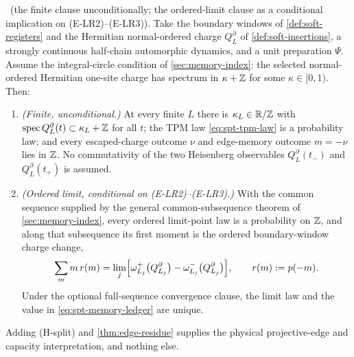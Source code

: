 \begin{theorem}\label{thm:spt-memory}
\statusProved\ (the finite clause unconditionally; the ordered-limit clause as
a conditional implication on (E-LR2)--(E-LR3)). Take the boundary windows of
\cref{def:soft-registers} and the Hermitian normal-ordered charge
$Q^{\partial}_L$ of \cref{def:soft-insertions}, a strongly continuous
half-chain automorphic dynamics, and a unit preparation $\Psi$. Assume the
integral-circle condition of \cref{sec:memory-index}: the selected
normal-ordered Hermitian one-site charge has spectrum in $\kappa+\mathbb{Z}$ for some
$\kappa\in[0,1)$. Then:
\begin{enumerate}
\item \emph{(Finite, unconditional.)} At every finite $L$ there is
  $\kappa_L\in\mathbb{R}/\mathbb{Z}$ with $\operatorname{spec} Q^{\partial}_L(t)\subset\kappa_L+\mathbb{Z}$ for all
  $t$; the TPM law \eqref{eq:spt-tpm-law} is a probability law; and every
  escaped-charge outcome $\nu$ and edge-memory outcome $m=-\nu$ lies in $\mathbb{Z}$.
  No commutativity of the two Heisenberg observables $Q^{\partial}_L(t_-)$ and
  $Q^{\partial}_L(t_+)$ is assumed.
\item \emph{(Ordered limit, conditional on (E-LR2)--(E-LR3).)} With the
  common sequence supplied by the general common-subsequence theorem of
  \cref{sec:memory-index}, every ordered limit-point law is a probability on
  $\mathbb{Z}$, and along that subsequence its first moment is the ordered
  boundary-window charge change,
  \begin{equation}
    \sum_m m\,r(m)
     =\lim_{j}\Bigl[\omega^{+}_{L_j}\bigl(Q^{\partial}_{L_j}\bigr)
                   -\omega^{-}_{L_j}\bigl(Q^{\partial}_{L_j}\bigr)\Bigr],
    \qquad r(m):=p(-m).
    \label{eq:spt-memory-ledger}
  \end{equation}
  Under the optional full-sequence convergence clause, the limit law and the
  value in \eqref{eq:spt-memory-ledger} are unique.
\end{enumerate}
Adding (H-split) and \cref{thm:edge-residue} supplies the physical
projective-edge and capacity interpretation, and nothing else.
\end{theorem}

